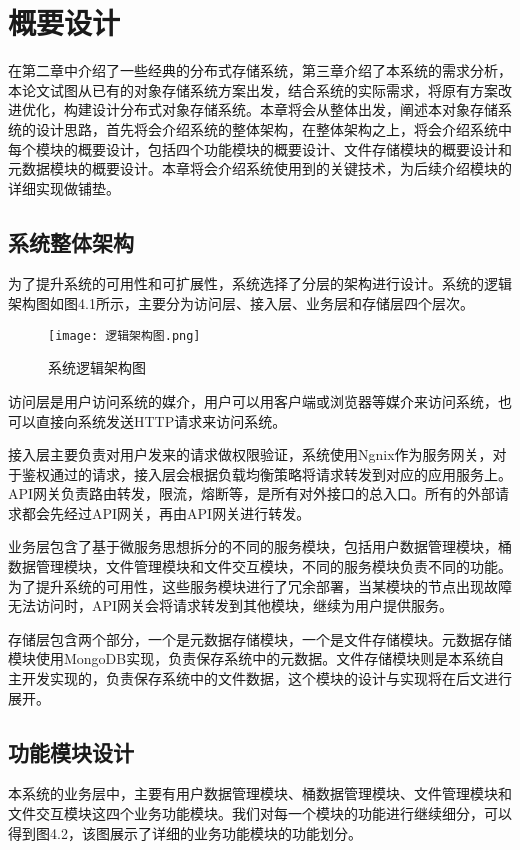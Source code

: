 
\chapter{概要设计}
在第二章中介绍了一些经典的分布式存储系统，第三章介绍了本系统的需求分析，本论文试图从已有的对象存储系统方案出发，结合系统的实际需求，将原有方案改进优化，构建设计分布式对象存储系统。本章将会从整体出发，阐述本对象存储系统的设计思路，首先将会介绍系统的整体架构，在整体架构之上，将会介绍系统中每个模块的概要设计，包括四个功能模块的概要设计、文件存储模块的概要设计和元数据模块的概要设计。本章将会介绍系统使用到的关键技术，为后续介绍模块的详细实现做铺垫。

\section{系统整体架构}%
为了提升系统的可用性和可扩展性，系统选择了分层的架构进行设计。系统的逻辑架构图如图4.1所示，主要分为访问层、接入层、业务层和存储层四个层次。

\begin{figure}[h]
  \centering
  \texttt{[image: 逻辑架构图.png]}
  \caption{系统逻辑架构图}
\end{figure}

访问层是用户访问系统的媒介，用户可以用客户端或浏览器等媒介来访问系统，也可以直接向系统发送HTTP请求来访问系统。

接入层主要负责对用户发来的请求做权限验证，系统使用Ngnix作为服务网关，对于鉴权通过的请求，接入层会根据负载均衡策略将请求转发到对应的应用服务上。API网关负责路由转发，限流，熔断等，是所有对外接口的总入口。所有的外部请求都会先经过API网关，再由API网关进行转发。

业务层包含了基于微服务思想拆分的不同的服务模块，包括用户数据管理模块，桶数据管理模块，文件管理模块和文件交互模块，不同的服务模块负责不同的功能。为了提升系统的可用性，这些服务模块进行了冗余部署，当某模块的节点出现故障无法访问时，API网关会将请求转发到其他模块，继续为用户提供服务。

存储层包含两个部分，一个是元数据存储模块，一个是文件存储模块。元数据存储模块使用MongoDB实现，负责保存系统中的元数据。文件存储模块则是本系统自主开发实现的，负责保存系统中的文件数据，这个模块的设计与实现将在后文进行展开。

\section{功能模块设计}
本系统的业务层中，主要有用户数据管理模块、桶数据管理模块、文件管理模块和文件交互模块这四个业务功能模块。我们对每一个模块的功能进行继续细分，可以得到图4.2，该图展示了详细的业务功能模块的功能划分。

